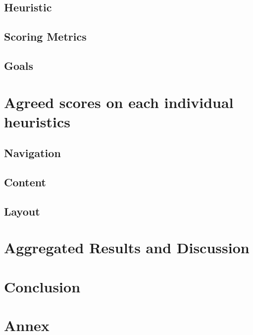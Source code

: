 \documentclass[11pt, a4paperm, hidelinks]{article}
\begin{document}
	\subsection{Heuristic}
	

	\subsection{Scoring Metrics}
	

	\subsection{Goals}
	
	\clearpage


	\section{Agreed scores on each individual heuristics}

	\subsection{Navigation}
	

	\subsection{Content}
	

	\subsection{Layout}
	
	\clearpage


	\section{Aggregated Results and Discussion}
	
	\clearpage

	\section{Conclusion}	
	
	\clearpage

	\appendix
	\section{Annex}
	
\end{document}
